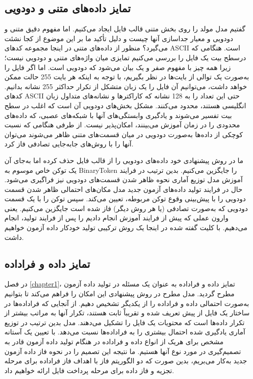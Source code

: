 \subsection{تمایز داده‌های متنی و دودویی}
گفتیم مدل مولد را روی بخش متنی قالب فایل ایجاد می‌کنیم. اما مفهوم دقیق متنی و دودویی و معیار جداسازی آنها چیست و دلیل تأکید ما بر این موضوع از کجا نشئت می‌گیرد؟ منظور از داده‌های متنی در اینجا مجموعه کدهای \gls{ASCII} است. هنگامی که درسطح بیت یک فایل را بررسی می‌کنیم تمایزی میان واژه‌های متنی و دودویی نیست؛ زیرا همه چیز با مفهوم صفر و یک بیان می‌شود که دودویی است. اما اگر فایل را به‌صورت یک توالی از بایت‌ها در نظر بگیریم، با توجه به اینکه هر بایت 255 حالت ممکن خواهد داشت، می‌توانیم آن فایل را یک زبان متشکل از تکرار حداکثر 255 نشانه بدانیم. کدهای  \gls{ASCII} حتی این تعداد را به 128 نشانه که کاراکترها و نشانه‌های متداول زبان انگلیسی هستند، محدود می‌کنند. مشکل بخش‌های دودویی آن است که اغلب در سطح بیت تفسیر می‌شوند و یادگیری وابستگی‌های آنها با شبکه‌های عصبی، که داده‌های محدودی را در زمان آموزش می‌بینند، امکان‌پذیر نیست. از طرفی هنگامی که نسبت کوچکی از داده‌ها به‌صورت دودویی در میان قسمت‌های متنی ظاهر می‌شوند می‌توان آنها را با روش‌های جابه‌جایی تصادفی فاز کرد.

ما در روش پیشنهادی خود داده‌های دودویی را از قالب فایل حذف کرده اما به‌جای آن یک توکن خاص موسوم به \gls{BinaryToken} را جایگزین می‌کنیم. بدین ترتیب در فرایند آموزش مدل توزیع آماری نحوه ظاهر شدن قسمت‌های دودویی نیز فراگیری می‌شود. حال در فرایند تولید داده‌های آزمون جدید مدل مکان‌های احتمالی ظاهر شدن قسمت دودویی را با پیش‌بینی وقوع توکن مربوطه، تعیین می‌کند. سپس توکن را با یک قسمت دودویی که به‌صورت تصادفی (یا هر روش دیگر) فاز شده است جایگزین می‌کنیم. یعنی وارون عملی که پیش از فرایند آموزش انجام دادیم را پس از فرایند تولید، انجام می‌دهیم. با کلیت گفته شده در اینجا یک روش ترکیبی تولید خودکار داده آزمون خواهیم داشت.


\subsection{تمایز داده و فراداده}\label{sec:data_and_metadata}
در فصل \ref{chapter1}، تمایز داده و فراداده به عنوان یک مسئله در تولید داده آزمون مطرح گردید. مدل مطرح در روش پیشنهادی این امکان را فراهم می‌کند تا بتوانیم به‌صورت احتمالی داده و فراداده را از یکدیگر تشخیص دهیم. از آنجایی که فراداده‌ها در ساختار یک فایل از پیش‌ تعریف شده و تقریباً ثابت هستند، تکرار آنها به مراتب بیشتر از تکرار داده‌ها است که محتویات یک فایل را تشکیل می‌دهند. مدل بدین ترتیب در توزیع آماری یادگیری شده احتمال بیشتری را به فراداده‌ها نسبت می‌دهد. با تعیین یک آستانه مشخص برای هریک از انواع داده و فراداده در هنگام تولید داده آزمون قادر به تصمیم‌گیری در مورد نوع آنها هستیم. ما نتیجه این تصمیم را در نحوه فاز داده آزمون جدید به‌کار می‌بریم، بدین صورت که دو الگوریتم فاز با اهداف فاز فراداده برای مرحله تجزیه و فاز داده برای مرحله پرداخت فایل ارائه خواهیم داد.     


